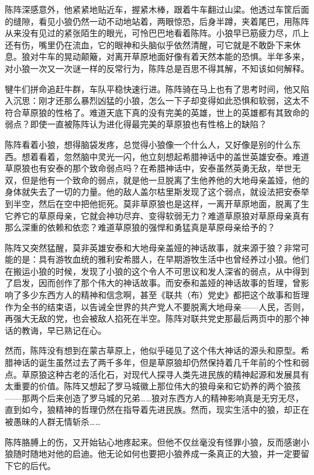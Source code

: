 \par 陈阵深感意外，他紧紧地贴近车，握紧木棒，跟着牛车翻过山梁。他透过车筐后面的缝隙，看见小狼仍然一动不动地站着，两眼惊恐，后身半蹲，夹着尾巴，用陈阵从来没有见过的紧张陌生的眼光，可怜巴巴地看着陈阵。小狼早已筋疲力尽，爪上还有伤，嘴里仍在流血，它的眼神和头脑似乎依然清醒，可它就是不敢卧下来休息。狼对牛车的晃动颠簸，对离开草原地面好像有着天然本能的恐惧。半年多来，对小狼一次又一次谜一样的反常行为，陈阵总是百思不得其解，不知该如何解释。
\par 犍牛们拼命追赶牛群，车队平稳快速行进。陈阵骑在马上也有了思考时间，他又陷入沉思：刚才还那么暴烈凶猛的小狼，怎么一下子却变得如此恐惧和软弱，这太不符合草原狼的性格了。难道天底下真的没有完美的英雄，世上的英雄都有其致命的弱点？即使一直被陈阵认为进化得最完美的草原狼也有性格上的缺陷？
\par 陈阵看着小狼，想得脑袋发疼，总觉得小狼像一个什么人，又好像是别的什么东西。想着看着，忽然脑中灵光一闪，他立刻想起希腊神话中的盖世英雄安泰。难道草原狼也有安泰的那个致命弱点吗？在希腊神话中，安泰虽然英勇无敌，举世无双，但是他有一个致命的弱点，就是他一旦脱离了生他养他的大地母亲盖娅，他的身体就失去了一切的力量。他的敌人盖尔枯里斯发现了这个弱点，就设法把安泰举到半空，然后在空中把他扼死。莫非草原狼也是这样，一离开草原地面，脱离了生它养它的草原母亲，它就会神功尽弃、变得软弱无力？难道草原狼对草原母亲真有那么深重的依赖和依恋？难道草原狼的强悍和勇猛真是草原母亲给予的？
\par 陈阵又突然猛醒，莫非英雄安泰和大地母亲盖娅的神话故事，就来源于狼？非常可能的是：具有游牧血统的雅利安希腊人，在早期游牧生活中也曾经养过小狼。他们在搬运小狼的时候，发现了小狼的这个令人不可思议和发人深省的弱点，从中得到了启发，因而创作了那个伟大的神话故事。而安泰和盖娅的神话故事的哲理，曾影响了多少东西方人的精神和信念啊，甚至《联共（布）党史》都把这个故事和哲理作为全书的结束语，以告诫全世界的共产党人不要脱离大地母亲——人民，否则，再强大无敌的党，也会被敌人掐死在半空。陈阵对联共党史那最后两页中的那个神话的教诲，早已熟记在心。
\par 然而，陈阵没有想到在蒙古草原上，他似乎碰见了这个伟大神话的源头和原型。希腊神话的诞生虽然过去了两千多年，但是草原狼却仍然保持着几千年前的个性和弱点。草原狼这种古老的活化石，对现代人探寻人类先进民族的精神起源和发展具有太重要的价值。陈阵又想起了罗马城徽上那位伟大的狼母亲和它奶养的两个狼孩——那两个后来创造了罗马城的兄弟……狼对东西方人的精神影响真是无穷无尽，直到如今，狼精神的哲理仍然在指导着先进民族。然而，现实生活中的狼，却正在被愚昧的人群无情斩杀……
\par 陈阵胳膊上的伤，又开始钻心地疼起来。但他不仅丝毫没有怪罪小狼，反而感谢小狼随时随地对他的启迪。他无论如何也要把小狼养成一条真正的大狼，并一定要留下它的后代。
